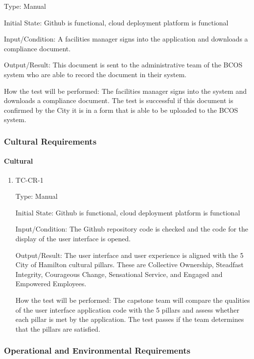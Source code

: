 \documentclass[12pt, titlepage]{article}
\begin{document}
\begin{enumerate}
    Type: Manual

    Initial State: Github is functional, cloud deployment platform is functional

    Input/Condition: A facilities manager signs into the application and
    downloads a compliance document.

    Output/Result: This document is sent to the administrative team of the BCOS
    system who are able to record the document in their system.

    How the test will be performed: The facilities manager signs into the system
    and downloads a compliance document. The test is successful if this
    document is confirmed by the City it is in a form that is able to be
    uploaded to the BCOS system.

\end{enumerate}

\subsubsection{Cultural Requirements}

\paragraph{Cultural}

\begin{enumerate}
  \item{TC-CR-1\\}

    Type: Manual

    Initial State: Github is functional, cloud deployment platform is functional

    Input/Condition: The Github repository code is checked and the code for the
    display of the user interface is opened.

    Output/Result: The user interface and user experience is aligned with the 5
    City of Hamilton cultural pillars. These are Collective Ownership,
    Steadfast Integrity, Courageous Change, Sensational Service, and
    Engaged and Empowered Employees.

    How the test will be performed: The capstone team will compare the qualities
    of the user interface application code with the 5 pillars and assess whether
    each pillar is met by the application. The test passes if the
    team determines
    that the pillars are satisfied.
\end{enumerate}

\subsubsection{Operational and Environmental Requirements}
\end{document}
